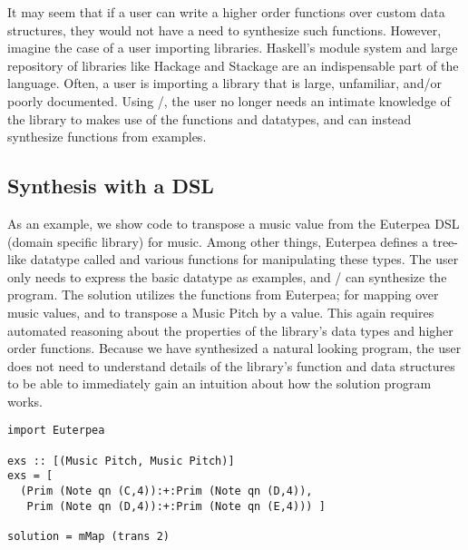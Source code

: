 It may seem that if a user can write a higher order functions over custom data structures, they would not have a need to synthesize such functions.
However, imagine the case of a user importing libraries.
Haskell's module system and large repository of libraries like Hackage and Stackage are an indispensable part of the language\cite{hackage,stackage}.
Often, a user is importing a library that is large, unfamiliar, and/or poorly documented.
Using \ourTool/, the user no longer needs an intimate knowledge of the library to makes use of the functions and datatypes, and can instead synthesize functions from examples.


\subsection{Synthesis with a DSL}

As an example, we show code to transpose a music value from the Euterpea DSL (domain specific library) for music\cite{euterpea}.
Among other things, Euterpea defines a tree-like datatype called  and various functions for manipulating these types.
The user only needs to express the basic datatype as examples, and \ourTool/ can synthesize the  program.
The solution utilizes the functions from Euterpea;  for mapping over music values, and  to transpose a Music Pitch by a value.
This again requires automated reasoning about the properties of the library's data types and higher order functions.
Because we have synthesized a natural looking program, the user does not need to understand details of the library's function and data structures to be able to immediately gain an intuition about how the solution program works.

\begin{lstlisting}
import Euterpea

exs :: [(Music Pitch, Music Pitch)]
exs = [
  (Prim (Note qn (C,4)):+:Prim (Note qn (D,4)),
   Prim (Note qn (D,4)):+:Prim (Note qn (E,4))) ]
        
solution = mMap (trans 2)
\end{lstlisting}

